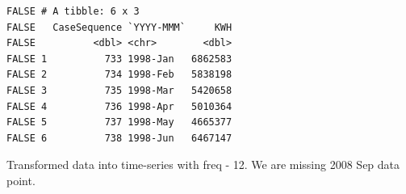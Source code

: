 \documentclass[openany]{book}
\newenvironment{Shaded}{\begin{snugshade}}{\end{snugshade}}
\newcommand{\KeywordTok}[1]{\textcolor[rgb]{0.13,0.29,0.53}{\textbf{#1}}}
\newcommand{\DataTypeTok}[1]{\textcolor[rgb]{0.13,0.29,0.53}{#1}}
\newcommand{\DecValTok}[1]{\textcolor[rgb]{0.00,0.00,0.81}{#1}}
\newcommand{\StringTok}[1]{\textcolor[rgb]{0.31,0.60,0.02}{#1}}
\newcommand{\OperatorTok}[1]{\textcolor[rgb]{0.81,0.36,0.00}{\textbf{#1}}}
\newcommand{\NormalTok}[1]{#1}
\begin{document}
\begin{verbatim}
FALSE # A tibble: 6 x 3
FALSE   CaseSequence `YYYY-MMM`     KWH
FALSE          <dbl> <chr>        <dbl>
FALSE 1          733 1998-Jan   6862583
FALSE 2          734 1998-Feb   5838198
FALSE 3          735 1998-Mar   5420658
FALSE 4          736 1998-Apr   5010364
FALSE 5          737 1998-May   4665377
FALSE 6          738 1998-Jun   6467147
\end{verbatim}

Transformed data into time-series with freq - 12. We are missing 2008
Sep data point.

\begin{Shaded}
\end{Shaded}
\end{document}
